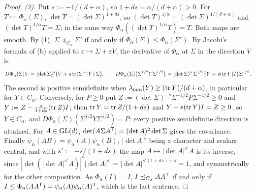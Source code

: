 \begin{proof}
\emph{(3).} Put $s := -1/(d+\alpha)$, so $1 + ds = \alpha/(d+\alpha) > 0$. For $T := \Phi_\alpha(\Sigma)$,
$\det T = (\det\Sigma)^{1+ds}$, so $(\det T)^{1/\alpha} = (\det\Sigma)^{1/(d+\alpha)}$ and
$(\det T)^{1/\alpha}T = \Sigma$; in the same way $\Phi_\alpha((\det T)^{1/\alpha}T) = T$. Both maps are
smooth. By (1), $\Sigma \preceq_{C_\alpha} \Sigma'$ if and only if $\Phi_\alpha(\Sigma) \le \Phi_\alpha(\Sigma')$.
By Jacobi's formula of (b) applied to $\varepsilon \mapsto \Sigma + \varepsilon V$, the derivative of
$\Phi_\alpha$ at $\Sigma$ in the direction $V$ is
\[
  D\Phi_\alpha(\Sigma)V = (\det\Sigma)^s\bigl(V + s\operatorname{tr}(\Sigma^{-1}V)\,\Sigma\bigr) ,
  \qquad
  D\Phi_\alpha(\Sigma)\bigl(\Sigma^{1/2}Y\Sigma^{1/2}\bigr) = (\det\Sigma)^s\,\Sigma^{1/2}\bigl(Y + s(\operatorname{tr} Y)I\bigr)\Sigma^{1/2} .
\]
The second is positive semidefinite when $\lambda_{\min}(Y) \ge (\operatorname{tr} Y)/(d+\alpha)$, in particular for
$Y \in C_\alpha$. Conversely, for $P \ge 0$ put $Z := (\det\Sigma)^{-s}\Sigma^{-1/2}P\Sigma^{-1/2} \ge 0$ and
$Y := Z - \frac{s}{1+ds}(\operatorname{tr} Z)I$; then $\operatorname{tr} Y = \operatorname{tr} Z/(1+ds)$ and $Y + s(\operatorname{tr} Y)I = Z \ge 0$, so $Y \in
C_\alpha$, and $D\Phi_\alpha(\Sigma)(\Sigma^{1/2}Y\Sigma^{1/2}) = P$: every positive semidefinite direction is
attained.
For $A \in \mathrm{GL}(d)$, $\det(A\Sigma A^{\mathsf{T}}) = (\det A)^2\det\Sigma$ gives the covariance. Finally
$\psi_\alpha(AB) = \psi_\alpha(A)\psi_\alpha(B)$, $|\det A|^s$ being a character and scalars central, and with
$s' := -s/(1+ds)$ the map $A \mapsto |\det A|^{s'}A$ is its inverse, since $|\det(|\det A|^{s'}A)|^s|\det A|^{s'} =
|\det A|^{s'(1+ds) + s} = 1$, and symmetrically for the other composition. As $\Phi_\alpha(I) = I$, $I \preceq_{C_\alpha} AA^{\mathsf{T}}$ if and only if
$I \le \Phi_\alpha(AA^{\mathsf{T}}) = \psi_\alpha(A)\psi_\alpha(A)^{\mathsf{T}}$, which is the last sentence.
\end{proof}
